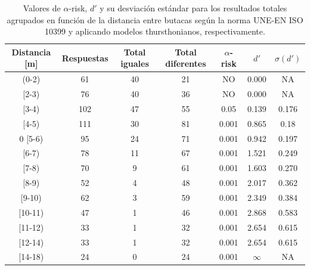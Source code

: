 \documentclass[11pt,a4paper,twoside]{book}
\begin{document}
            \begin{table}[H]
			\begin{center}
			\begin{scriptsize}
			\begin{tabular}{| c | c | c | c || c | c | c |}
			    \hline
				\textbf{Distancia [m]}&\textbf{Respuestas}&\textbf{Total iguales}&\textbf{Total diferentes}&\textbf{$\alpha$-risk}&\textbf{$d'$}&\textbf{$\sigma (d')$}\\ \hline
                (0-2)&61&40&21&NO&0.000&NA\\ \hline
                [2-3)&76&40&36&NO&0.000&NA\\ \hline
                [3-4)&102&47&55&0.05&0.139&0.176\\ \hline
                [4-5)&111&30&81&0.001&0.865&0.18\\ \hline0
                [5-6)&95&24&71&0.001&0.942&0.197\\ \hline
                [6-7)&78&11&67&0.001&1.521&0.249\\ \hline
                [7-8)&70&9&61&0.001&1.603&0.270\\ \hline
                [8-9)&52&4&48&0.001&2.017&0.362\\ \hline
                [9-10)&62&3&59&0.001&2.349&0.384\\ \hline
                [10-11)&47&1&46&0.001&2.868&0.583\\ \hline
                [11-12)&33&1&32&0.001&2.654&0.615\\ \hline
                [12-14)&33&1&32&0.001&2.654&0.615\\ \hline
                [14-18)&24&0&24&0.001&$\infty$&NA\\ \hline
			\end{tabular}
			\caption{Valores de $\alpha$-risk, $d'$ y su desviación estándar para los resultados totales agrupados en función de la distancia entre butacas según la norma UNE-EN ISO 10399 y aplicando modelos thursthonianos, respectivamente.}
			\label{tablaButacasDuda}
			\end{scriptsize}
			\end{center}	
		    \end{table}
		    
\end{document}
